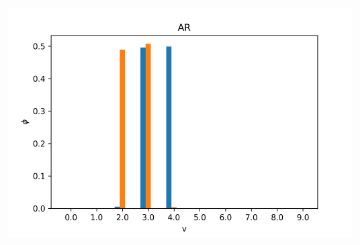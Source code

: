 \documentclass[12pt]{article}
\begin{document}
\begin{figure}[H]
\begin{subfigure}[b]{0.3\textwidth}
    \includegraphics[width=\linewidth]{latent_phis_AR_experiment-1|overlapping-yes_dataset-7.png}
  \end{subfigure}%


\end{figure}
\end{document}
